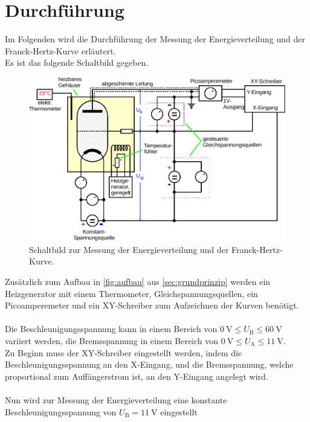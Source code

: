 \section{Durchführung}

    Im Folgenden wird die Durchführung der Messung der Energieverteilung und der Franck-Hertz-Kurve erläutert.\\
    Es ist das folgende Schaltbild gegeben.
    \begin{figure}[H]
        \centering
        \includegraphics[width=\textwidth]{content/img/Abb_6.pdf}
        \caption{Schaltbild zur Messung der Energieverteilung und der Franck-Hertz-Kurve. \cite{versuchsanleitung}}
        \label{fig:schaltbild}
    \end{figure}
    Zusätzlich zum Aufbau in \autoref{fig:aufbau} aus \autoref{sec:grundprinzip}
    werden ein Heizgenerator mit einem Thermometer,
    Gleichspannungsquellen,
    ein Picoamperemeter
    und ein XY-Schreiber zum Aufzeichnen der Kurven benötigt.\\
    \\
    Die Beschleunigungsspannung kann in einem Bereich von $\SI{0}{\volt} \leq U_\text{B} \leq \SI{60}{\volt}$ variiert werden,
    die Bremsspannung in einem Bereich von $\SI{0}{\volt} \leq U_\text{A} \leq \SI{11}{\volt}$.\\
    Zu Beginn muss der XY-Schreiber eingestellt werden,
    indem die Beschleunigungsspannung an den X-Eingang,
    und die Bremsspannung, welche proportional zum Auffängerstrom ist,
    an den Y-Eingang angelegt wird.\\
    \\
    Nun wird zur Messung der Energieverteilung eine konstante Beschleunigungsspannung von $U_\text{B} = \SI{11}{\volt}$ eingestellt
